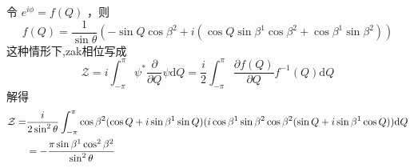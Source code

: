 \documentclass[hyperref,UTF8]{ctexart}
\begin{document}
令 $e^{i\phi}=f(Q)$ ，则
\[f(Q)=\frac{1}{\sin \theta }(-\sin Q \cos \beta ^2+i(\cos Q \sin \beta ^1 \cos\beta ^2+\cos \beta ^1 \sin \beta ^2))\]
这种情形下,zak相位写成
\[\mathcal{Z} =i\int_{-\pi}^{\pi} \psi^*\frac{\partial}{\partial Q}\psi\mathrm{d}Q=\frac{i}{2}\int_{-\pi}^{\pi}\frac{\partial f(Q)}{\partial Q}f^{-1}(Q)\mathrm{d}Q\]
解得
\begin{align*}
    \mathcal{Z}=&\frac{i}{2\sin ^2\theta}\int_{-\pi}^{\pi}\cos \beta ^2   (\cos Q+i \sin \beta ^1 \sin Q) (i \cos \beta ^1 \sin \beta^2\cos \beta ^2 (\sin Q+i \sin \beta ^1 \cos Q))\mathrm{d}Q\\
    &=- {{\pi  \sin \beta ^1 \cos ^2\beta ^2 }\over{\sin ^2\theta} }
\end{align*}
\end{document}
